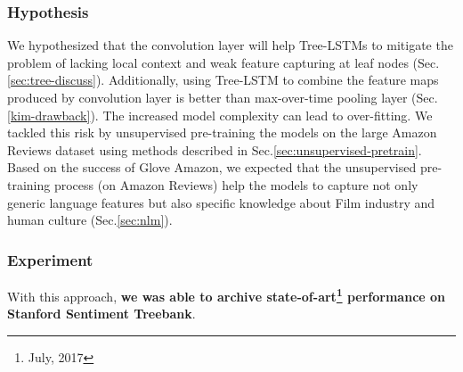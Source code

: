 \subsubsection{Hypothesis}
We hypothesized that the convolution layer will help Tree-LSTMs to mitigate the problem of lacking local context and weak feature capturing at leaf nodes (Sec.\ref{sec:tree-discuss}).
Additionally, using Tree-LSTM to combine the feature maps produced by convolution layer is better than max-over-time pooling layer (Sec.\ref{kim-drawback}).
The increased model complexity can lead to over-fitting.
We tackled this risk by unsupervised pre-training the models on the large Amazon Reviews dataset using methods described in Sec.\ref{sec:unsupervised-pretrain}.
Based on the success of Glove Amazon, we expected that the unsupervised pre-training process (on Amazon Reviews) help the models to capture not only generic language features but also specific knowledge about Film industry and human culture (Sec.\ref{sec:nlm}).

\subsubsection{Experiment}
With this approach, \textbf{we was able to archive state-of-art\footnote{July, 2017} performance on Stanford Sentiment Treebank}.


